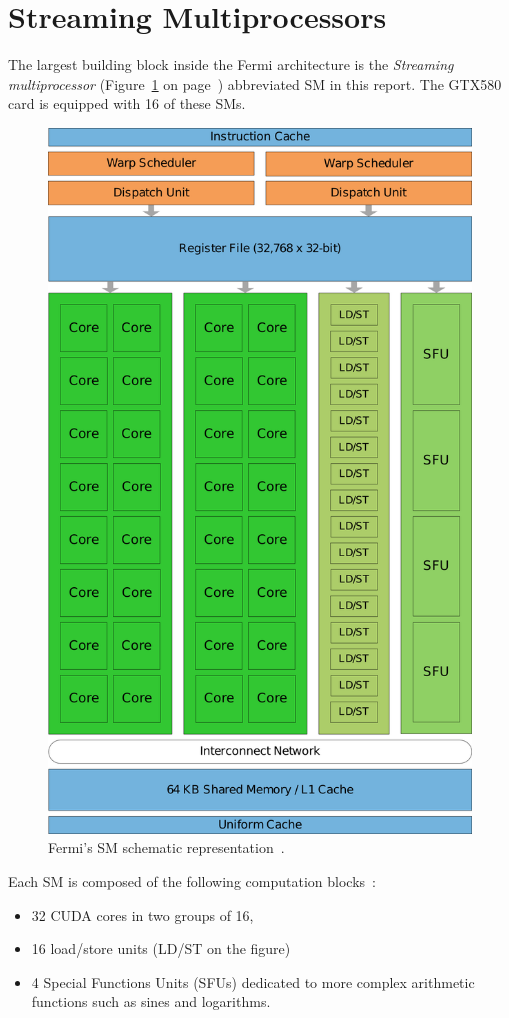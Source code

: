 \documentclass{report}
\begin{document}
    \section{Streaming Multiprocessors}
    The largest building block inside the Fermi architecture is the 
    \emph{Streaming multiprocessor} (Figure~\ref{fig:SM} on page~\pageref{fig:SM})
    abbreviated SM in this report. The GTX580 card is equipped
    with 16 of these SMs.
    \begin{figure}[H]
    \centering
        \includegraphics[width=0.75\linewidth]{pictures/Fermi}
        \captionsetup{justification=centering}
        \caption{Fermi's SM schematic representation~\cite{fermiwhitepap}.}
        \label{fig:SM}
    \end{figure}

    Each SM is composed of the following computation blocks~\cite{fermiwhitepap}:
    \begin{itemize}
        \item 32 CUDA cores in two groups of 16,
        \item 16 load/store units (LD/ST on the figure)
        \item 4 Special Functions Units (SFUs) dedicated to more complex
              arithmetic functions such as sines and logarithms.
    \end{itemize}
    
\end{document}
